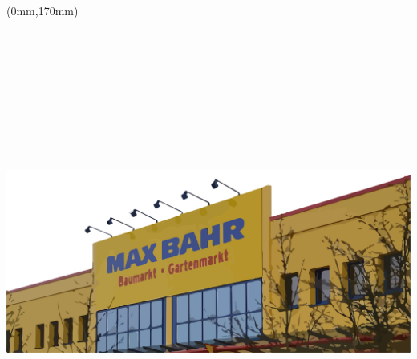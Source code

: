 \documentclass[11pt, a4paper,ngerman]{article}
\begin{document}
\begin{textblock*}{500mm}(0mm,170mm)
\includegraphics[height=160mm,width=225mm]{./maxBahrbottom.png}\\
\end{textblock*}


\end{document}
